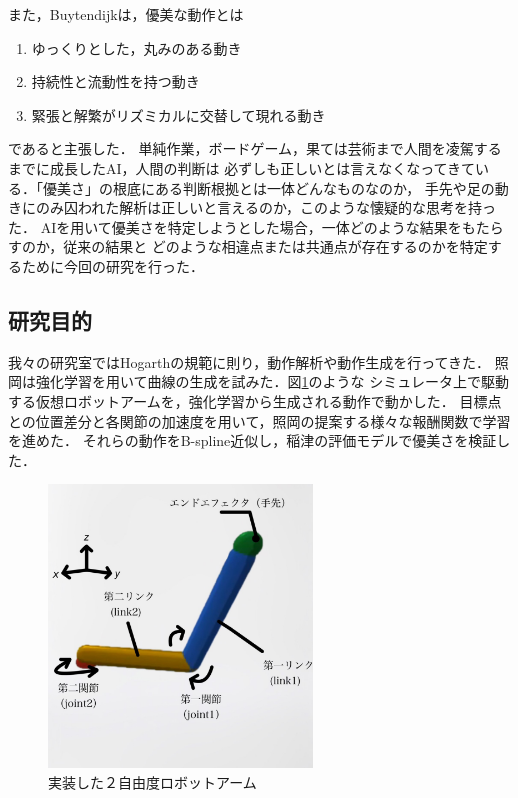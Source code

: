 \clearpage

また，Buytendijkは，優美な動作とは
\begin{enumerate}
  \item ゆっくりとした，丸みのある動き
  \item 持続性と流動性を持つ動き
  \item 緊張と解繁がリズミカルに交替して現れる動き
\end{enumerate}
であると主張した．
単純作業，ボードゲーム，果ては芸術まで人間を凌駕するまでに成長したAI，人間の判断は
必ずしも正しいとは言えなくなってきている．「優美さ」の根底にある判断根拠とは一体どんなものなのか，
手先や足の動きにのみ囚われた解析は正しいと言えるのか，このような懐疑的な思考を持った．
AIを用いて優美さを特定しようとした場合，一体どのような結果をもたらすのか，従来の結果と
どのような相違点または共通点が存在するのかを特定するために今回の研究を行った．

\subsection{研究目的}
我々の研究室ではHogarthの規範に則り，動作解析や動作生成を行ってきた．
照岡\cite{teruoka}は強化学習を用いて曲線の生成を試みた．図\ref{robot_arm}のような
シミュレータ上で駆動する仮想ロボットアームを，強化学習から生成される動作で動かした．
目標点との位置差分と各関節の加速度を用いて，照岡の提案する様々な報酬関数で学習を進めた．
それらの動作をB-spline近似\cite{bspline}し，稲津\cite{inadu}の評価モデルで優美さを検証した．

\begin{figure}[b]
  \begin{center}
    \includegraphics[width=70mm]{images/robot_arm.png}
  \end{center}
  \caption{実装した２自由度ロボットアーム}
  \label{robot_arm}
\end{figure}

